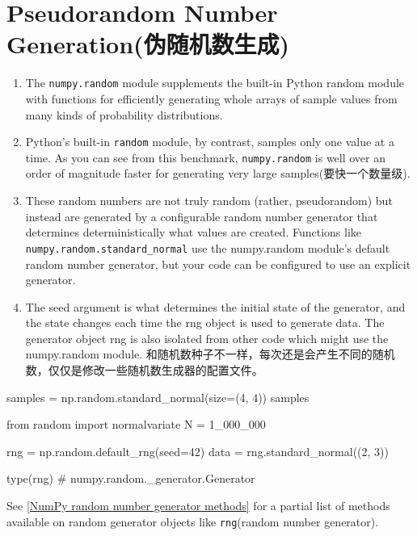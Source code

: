 \section{Pseudorandom Number Generation(伪随机数生成)}
\begin{enumerate}
    \item The \verb|numpy.random| module supplements the built-in Python random module with functions for efficiently generating whole arrays of sample values from many kinds of probability distributions. 
    \item Python's built-in \verb|random| module, by contrast, samples only one value at a time. As you can see from this benchmark, \verb|numpy.random| is well over an order of magnitude faster for generating very large samples(要快一个数量级).
    \item These random numbers are not truly random (rather, pseudorandom) but instead are generated by a configurable random number generator that determines deterministically what values are created. Functions like \verb|numpy.random.standard_normal| use the numpy.random module's default random number generator, but your code can be configured to use an explicit generator.
    \item The seed argument is what determines the initial state of the generator, and the state changes each time the rng object is used to generate data. The generator object rng is also isolated from other code which might use the numpy.random module. 和随机数种子不一样，每次还是会产生不同的随机数，仅仅是修改一些随机数生成器的配置文件。
\end{enumerate}

\begin{pyc}
samples = np.random.standard_normal(size=(4, 4))
samples

from random import normalvariate
N = 1_000_000



rng = np.random.default_rng(seed=42)
data = rng.standard_normal((2, 3))

type(rng)
# numpy.random._generator.Generator
\end{pyc}

See \autoref{NumPy random number generator methods} for a partial list of methods available on random generator objects like \verb|rng|(random number generator).

